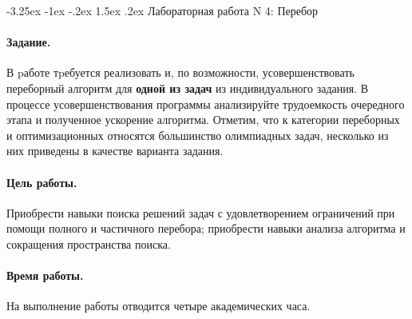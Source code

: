 \documentclass[12pt, openany, twoside]{book} %
\makeatletter
\renewcommand\section{\@startsection {section}{1}{\z@}%
                                   {-3.25ex \@plus -1ex \@minus -.2ex}%
                                   {1.5ex \@plus.2ex}%
                                   {\normalfont\large\bfseries}}
\makeatother
\begin{document}
\section{Лабораторная работа N 4: Перебор}

\paragraph{Задание.} В pаботе тpебуется реализовать и, по возможности, усовершенствовать переборный алгоритм для {\bf одной из задач} из индивидуального задания. В процессе усовершенствования программы анализируйте трудоемкость очередного этапа и полученное ускорение алгоритма. Отметим, что к категории переборных и оптимизационных относятся большинство олимпиадных задач, несколько из них приведены в качестве варианта задания.

\paragraph{Цель работы.} Приобрести навыки поиска решений задач с удовлетворением ограничений при помощи полного и частичного перебора; приобрести навыки анализа алгоритма и сокращения пространства поиска.

\paragraph{Время работы.} На выполнение работы отводится четыре академических часа.
\end{document}
